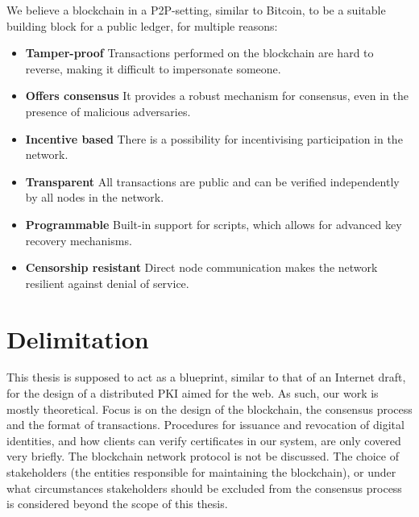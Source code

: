 \documentclass{style/kththesis}
\begin{document}
We believe a blockchain in a P2P-setting, similar to Bitcoin, to be a suitable building block for a public ledger, for multiple reasons:

\begin{itemize}
    \item[\checkmark] \textbf{Tamper-proof} Transactions performed on the blockchain are hard to reverse, making it difficult to impersonate someone.
    \item[\checkmark] \textbf{Offers consensus} It provides a robust mechanism for consensus, even in the presence of malicious adversaries.
    \item[\checkmark] \textbf{Incentive based} There is a possibility for incentivising participation in the network.
    \item[\checkmark] \textbf{Transparent} All transactions are public and can be verified independently by all nodes in the network.
    \item[\checkmark] \textbf{Programmable} Built-in support for scripts, which allows for advanced key recovery mechanisms.
    \item[\checkmark] \textbf{Censorship resistant} Direct node communication makes the network resilient against denial of service.
\end{itemize}

\section{Delimitation}
This thesis is supposed to act as a blueprint, similar to that of an Internet draft, for the design of a distributed PKI aimed for the web. As such, our work is mostly theoretical. Focus is on the design of the blockchain, the consensus process and the format of transactions. Procedures for issuance and revocation of digital identities, and how clients can verify certificates in our system, are only covered very briefly. The blockchain network protocol is not be discussed. The choice of stakeholders (the entities responsible for maintaining the blockchain), or under what circumstances stakeholders should be excluded from the consensus process is considered beyond the scope of this thesis.
\end{document}
